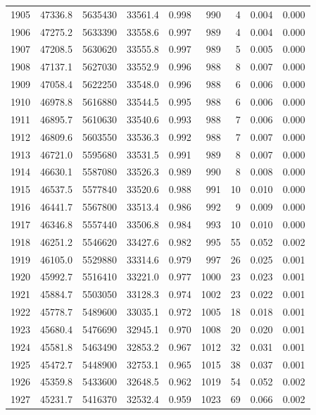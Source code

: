 \documentclass[
]{scrartcl}
\begin{document}
\begin{table}
{\begin{tabular*}{\linewidth}{@{\extracolsep{\fill}}rrrrrrrrr}
1905 & 47336.8 & 5635430 & 33561.4 & 0.998 & 990 & 4 & 0.004 & 0.000 \\ 
1906 & 47275.2 & 5633390 & 33558.6 & 0.997 & 989 & 4 & 0.004 & 0.000 \\ 
1907 & 47208.5 & 5630620 & 33555.8 & 0.997 & 989 & 5 & 0.005 & 0.000 \\ 
1908 & 47137.1 & 5627030 & 33552.9 & 0.996 & 988 & 8 & 0.007 & 0.000 \\ 
1909 & 47058.4 & 5622250 & 33548.0 & 0.996 & 988 & 6 & 0.006 & 0.000 \\ 
1910 & 46978.8 & 5616880 & 33544.5 & 0.995 & 988 & 6 & 0.006 & 0.000 \\ 
1911 & 46895.7 & 5610630 & 33540.6 & 0.993 & 988 & 7 & 0.006 & 0.000 \\ 
1912 & 46809.6 & 5603550 & 33536.3 & 0.992 & 988 & 7 & 0.007 & 0.000 \\ 
1913 & 46721.0 & 5595680 & 33531.5 & 0.991 & 989 & 8 & 0.007 & 0.000 \\ 
1914 & 46630.1 & 5587080 & 33526.3 & 0.989 & 990 & 8 & 0.008 & 0.000 \\ 
1915 & 46537.5 & 5577840 & 33520.6 & 0.988 & 991 & 10 & 0.010 & 0.000 \\ 
1916 & 46441.7 & 5567800 & 33513.4 & 0.986 & 992 & 9 & 0.009 & 0.000 \\ 
1917 & 46346.8 & 5557440 & 33506.8 & 0.984 & 993 & 10 & 0.010 & 0.000 \\ 
1918 & 46251.2 & 5546620 & 33427.6 & 0.982 & 995 & 55 & 0.052 & 0.002 \\ 
1919 & 46105.0 & 5529880 & 33314.6 & 0.979 & 997 & 26 & 0.025 & 0.001 \\ 
1920 & 45992.7 & 5516410 & 33221.0 & 0.977 & 1000 & 23 & 0.023 & 0.001 \\ 
1921 & 45884.7 & 5503050 & 33128.3 & 0.974 & 1002 & 23 & 0.022 & 0.001 \\ 
1922 & 45778.7 & 5489600 & 33035.1 & 0.972 & 1005 & 18 & 0.018 & 0.001 \\ 
1923 & 45680.4 & 5476690 & 32945.1 & 0.970 & 1008 & 20 & 0.020 & 0.001 \\ 
1924 & 45581.8 & 5463490 & 32853.2 & 0.967 & 1012 & 32 & 0.031 & 0.001 \\ 
1925 & 45472.7 & 5448900 & 32753.1 & 0.965 & 1015 & 38 & 0.037 & 0.001 \\ 
1926 & 45359.8 & 5433600 & 32648.5 & 0.962 & 1019 & 54 & 0.052 & 0.002 \\ 
1927 & 45231.7 & 5416370 & 32532.4 & 0.959 & 1023 & 69 & 0.066 & 0.002 \\ 

\end{tabular*}}
\end{table}
\end{document}

